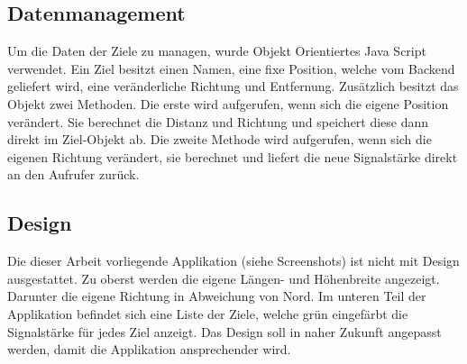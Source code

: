 \subsection{Datenmanagement} %
\label{sub:datenmanagement}
Um die Daten der Ziele zu managen, wurde Objekt Orientiertes Java Script verwendet. Ein Ziel besitzt einen Namen, eine fixe Position, welche vom Backend geliefert wird, eine veränderliche Richtung und Entfernung. Zusätzlich besitzt das Objekt zwei Methoden. Die erste wird aufgerufen, wenn sich die eigene Position verändert. Sie berechnet die Distanz und Richtung und speichert diese dann direkt im Ziel-Objekt ab. Die zweite Methode wird aufgerufen, wenn sich die eigenen Richtung verändert, sie berechnet und liefert die neue Signalstärke direkt an den Aufrufer zurück. 

\subsection{Design} %
\label{sub:design}
Die dieser Arbeit vorliegende Applikation (siehe Screenshots) ist nicht mit Design ausgestattet. Zu oberst werden die eigene Längen- und Höhenbreite angezeigt. Darunter die eigene Richtung in Abweichung von Nord. 
Im unteren Teil der Applikation befindet sich eine Liste der Ziele, welche grün eingefärbt die Signalstärke für jedes Ziel anzeigt. Das Design soll in naher Zukunft angepasst werden, damit die Applikation ansprechender wird.

